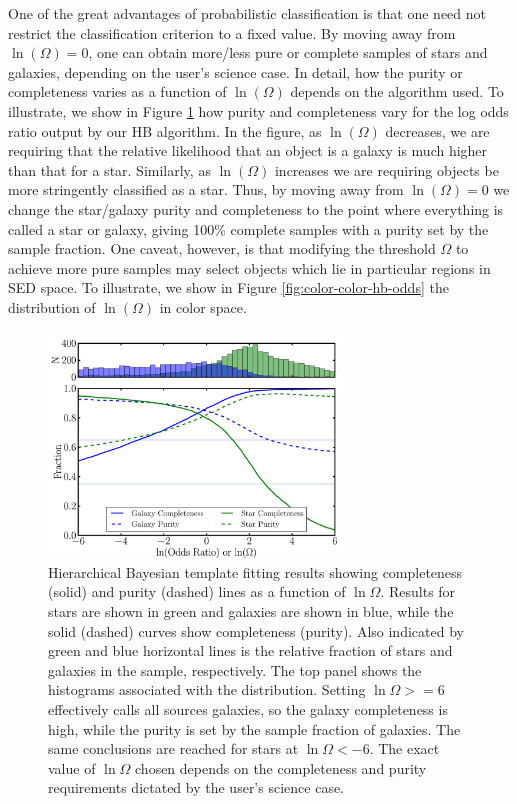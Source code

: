 \documentclass[12pt,preprint]{aastex}
\begin{document}
One of the great advantages of probabilistic classification is that
one need not restrict the classification criterion to a fixed value.
By moving away from $\ln(\Omega)=0$, one can obtain more/less pure or
complete samples of stars and galaxies, depending on the user's
science case.  In detail, how the purity or completeness varies as a
function of $\ln(\Omega)$ depends on the algorithm used.  To
illustrate, we show in Figure \ref{fig:hb-logodds} how purity and
completeness vary for the log odds ratio output by our HB algorithm.
In the figure, as $\ln(\Omega)$ decreases, we are requiring that the
relative likelihood that an object is a galaxy is much higher than
that for a star.  Similarly, as $\ln(\Omega)$ increases we are
requiring objects be more stringently classified as a star.  Thus, by
moving away from $\ln(\Omega)=0$ we change the star/galaxy purity and
completeness to the point where everything is called a star or galaxy,
giving 100\% complete samples with a purity set by the sample
fraction.  One caveat, however, is that modifying the threshold
$\Omega$ to achieve more pure samples may select objects which lie in
particular regions in SED space.  To illustrate, we show in Figure
\ref{fig:color-color-hb-odds} the distribution of $\ln(\Omega)$ in
color space.

\begin{figure}
\centering
 \includegraphics[clip=true, trim=0cm 0cm 0.0cm 0.cm,width=8cm]{fig7.pdf}
\caption{Hierarchical Bayesian template fitting results showing
  completeness (solid) and purity (dashed) lines as a function of
  $\ln\Omega$.  Results for stars are shown in green and galaxies are
  shown in blue, while the solid (dashed) curves show completeness
  (purity).  Also indicated by green and blue horizontal lines is the
  relative fraction of stars and galaxies in the sample, respectively.
  The top panel shows the histograms associated with the
  distribution. Setting $\ln\Omega>=6$ effectively calls all sources
  galaxies, so the galaxy completeness is high, while the purity is
  set by the sample fraction of galaxies.  The same conclusions are
  reached for stars at $\ln\Omega<-6$.  The exact value of $\ln\Omega$
  chosen depends on the completeness and purity requirements dictated
  by the user's science case.}
\label{fig:hb-logodds}
\end{figure}
\end{document}

